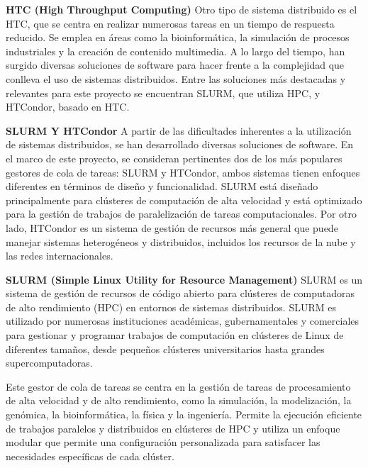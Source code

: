 \begin{doublespace}
\begin{multicols}{2}
  \textbf{HTC (High Throughput Computing)}
  \newline  
  Otro tipo de sistema distribuido es el HTC, que se centra en realizar numerosas tareas en un tiempo de respuesta reducido. Se emplea en áreas como la bioinformática, la simulación de procesos industriales y la creación de contenido multimedia.
  A lo largo del tiempo, han surgido diversas soluciones de software para hacer frente a la complejidad que conlleva el uso de sistemas distribuidos. Entre las soluciones más destacadas y relevantes para este proyecto se encuentran SLURM, que utiliza HPC, y HTCondor, basado en HTC.  \vspace{3mm}

  \textbf{SLURM Y HTCondor}  
  \newline
  A partir de las dificultades inherentes a la utilización de sistemas distribuidos, se han desarrollado diversas soluciones de software. En el marco de este proyecto, se consideran pertinentes dos de los más populares gestores de cola de tareas: SLURM y HTCondor, ambos sistemas tienen enfoques diferentes en términos de diseño y funcionalidad. SLURM está diseñado principalmente para clústeres de computación de alta velocidad y está optimizado para la gestión de trabajos de paralelización de tareas computacionales. Por otro lado, HTCondor es un sistema de gestión de recursos más general que puede manejar sistemas heterogéneos y distribuidos, incluidos los recursos de la nube y las redes internacionales.

  \textbf{SLURM (Simple Linux Utility for Resource Management)}
  \newline
  SLURM es un sistema de gestión de recursos de código abierto para clústeres de computadoras de alto rendimiento (HPC) en entornos de sistemas distribuidos. SLURM es utilizado por numerosas instituciones académicas, gubernamentales y comerciales para gestionar y programar trabajos de computación en clústeres de Linux de diferentes tamaños, desde pequeños clústeres universitarios hasta grandes supercomputadoras.

  Este gestor de cola de tareas se centra en la gestión de tareas de procesamiento de alta velocidad y de alto rendimiento, como la simulación, la modelización, la genómica, la bioinformática, la física y la ingeniería. Permite la ejecución eficiente de trabajos paralelos y distribuidos en clústeres de HPC y utiliza un enfoque modular que permite una configuración personalizada para satisfacer las necesidades específicas de cada clúster.


\end{multicols}
\end{doublespace}
